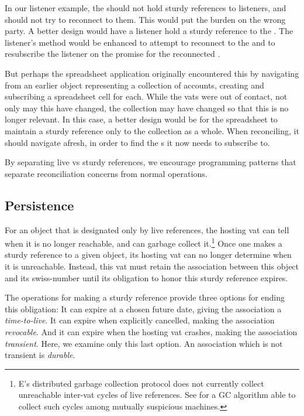 \documentclass{llncs}
\begin{document}
In our listener example, the  should not hold
sturdy references to listeners, and should not try to reconnect to
them. This would put the burden on the wrong party. A better design
would have a listener hold a sturdy reference to the
. The listener's 
method would be enhanced to attempt to reconnect to the
 and to resubscribe the listener on the promise for
the reconnected .

But perhaps the spreadsheet application originally encountered this
 by navigating from an earlier object representing
a collection of accounts, creating and subscribing a spreadsheet cell
for each. While the vats were out of contact, not only may this
 have changed, the collection may have changed so
that this  is no longer relevant. In this case, a
better design would be for the spreadsheet to maintain a sturdy
reference only to the collection as a whole. When reconciling, it
should navigate afresh, in order to find the s it
now needs to subscribe to.

By separating live vs sturdy references, we encourage programming
patterns that separate reconciliation concerns from normal operations.

\subsection{Persistence}

For an object that is designated only by live references, the hosting
vat can tell when it is no longer reachable, and can garbage collect
it.\footnote{
%
E's distributed garbage collection protocol does not currently collect
unreachable inter-vat cycles of live references. See \cite{bejar:gc}
for a GC algorithm able to collect such cycles among mutually
suspicious machines.}
%
Once one makes a sturdy reference to a given object, its hosting vat
can no longer determine when it is unreachable. Instead, this vat must
retain the association between this object and its swiss-number until
its obligation to honor this sturdy reference expires.

The operations for making a sturdy reference provide three options for
ending this obligation: It can expire at a chosen future date, giving
the association a \emph{time-to-live}. It can expire when explicitly
cancelled, making the association \emph{revocable}. And it can expire
when the hosting vat crashes, making the association
\emph{transient}. Here, we examine only this last option. An
association which is not transient is \emph{durable}.
\end{document}
